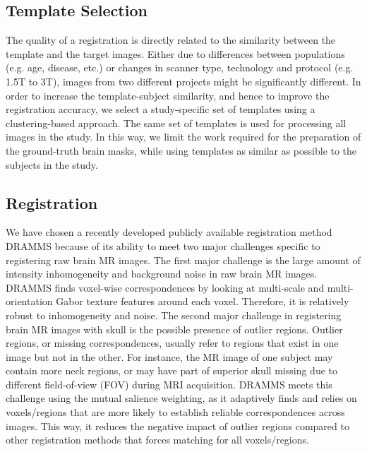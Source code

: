 \documentclass[letterpaper,10pt,english]{sphinxhowto}
\begin{document}
\subsection{Template Selection}
\label{about:template-selection}
The quality of a registration is directly related to the similarity between
the template and the target images. Either due to differences between populations
(e.g. age, disease, etc.) or changes in scanner type, technology and
protocol (e.g. 1.5T to 3T), images from two different projects might be significantly
different. In order to increase the template-subject similarity, and
hence to improve the registration accuracy, we select a study-specific set of
templates using a clustering-based approach. The same set of templates is used
for processing all images in the study. In this way, we limit the work required
for the preparation of the ground-truth brain masks, while using templates as similar
as possible to the subjects in the study.


\subsection{Registration}
\label{about:registration}
We have chosen a recently developed publicly available registration method
DRAMMS because of its ability to meet two major challenges specific
to registering raw brain MR images. The first major challenge is the large
amount of intensity inhomogeneity and background noise in raw brain MR
images. DRAMMS finds voxel-wise correspondences by looking at multi-scale
and multi-orientation Gabor texture features around each voxel. Therefore,
it is relatively robust to inhomogeneity and noise. The second major challenge
in registering brain MR images with skull is the possible presence of
outlier regions. Outlier regions, or missing correspondences, usually refer to
regions that exist in one image but not in the other. For instance, the MR
image of one subject may contain more neck regions, or may have part of
superior skull missing due to different field-of-view (FOV) during MRI acquisition.
DRAMMS meets this challenge using the mutual salience weighting,
as it adaptively finds and relies on voxels/regions that are more likely to
establish reliable correspondences across images. This way, it reduces the
negative impact of outlier regions compared to other registration methods
that forces matching for all voxels/regions.
\end{document}
